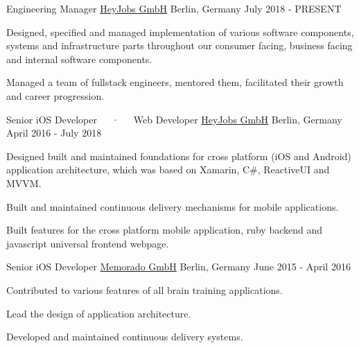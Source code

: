 

\begin{cventries}

  \cventry
    {Engineering Manager} %
    {\href{https://heyjobs.co}{HeyJobs GmbH}} %
    {Berlin, Germany} %
    {July 2018 - PRESENT} %
    {
      \begin{cvitems} %
        \item {Designed, specified and managed implementation of various software components, systems and infrastructure parts throughout our consumer facing, business facing and internal software components.}
        \item {Managed a team of fullstack engineers, mentored them, facilitated their growth and career progression.}
      \end{cvitems}
    }

  \cventry
    {Senior iOS Developer~~~·~~~Web Developer} %
    {\href{https://heyjobs.co}{HeyJobs GmbH}} %
    {Berlin, Germany} %
    {April 2016 - July 2018} %
    {
      \begin{cvitems} %
        \item {Designed built and maintained foundations for cross platform (iOS and Android) application architecture, which was based on Xamarin, C\#, ReactiveUI and MVVM.}
        \item {Built and maintained continuous delivery mechanisms for mobile applications.}
        \item {Built features for the cross platform mobile application, ruby backend and javascript universal frontend webpage.}
      \end{cvitems}
    }

  \cventry
    {Senior iOS Developer} %
    {\href{https://memorado.com}{Memorado GmbH}} %
    {Berlin, Germany} %
    {June 2015 - April 2016} %
    {
      \begin{cvitems} %
        \item {Contributed to various features of all brain training applications.}
        \item {Lead the design of application architecture.}
        \item {Developed and maintained continuous delivery systems.}
      \end{cvitems}
    }


\end{cventries}
